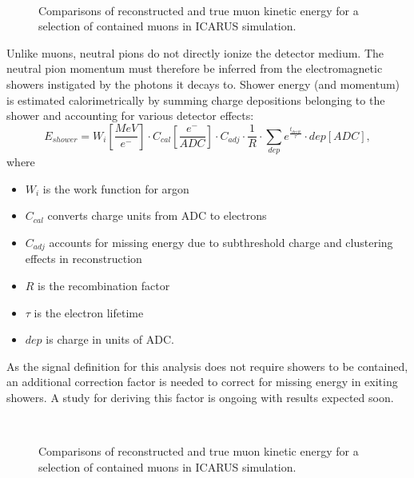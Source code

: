 \documentclass[../main.tex]{subfiles}
\begin{document}
\begin{figure}[H]
    \center
    \\


    \caption{Comparisons of reconstructed and true muon kinetic energy for a selection of contained muons in ICARUS simulation.}
    \label{fig:muon_energy}
\end{figure}

Unlike muons, neutral pions do not directly ionize the detector medium.  The neutral pion momentum must therefore be inferred from the electromagnetic showers instigated by the photons it decays to.  Shower energy (and momentum) is estimated calorimetrically by summing charge depositions belonging to the shower and accounting for various detector effects:
\begin{equation}
    E_{shower} = W_{i} [\frac{MeV}{e^{-}}] \cdot C_{cal} [\frac{e^{-}}{ADC}] \cdot C_{adj} \cdot \frac{1}{R} \cdot \sum_{dep} e^{\frac{t_{drift}}{\tau}} \cdot dep [ADC],
\end{equation}
where
\begin{itemize}[label=]
    \setlength\itemsep{0.1ex}
    \item $W_{i}$ is the work function for argon
    \item $C_{cal}$ converts charge units from ADC to electrons
    \item $C_{adj}$ accounts for missing energy due to subthreshold charge and clustering effects in reconstruction
    \item $R$ is the recombination factor
    \item $\tau$ is the electron lifetime
    \item $dep$ is charge in units of ADC.
\end{itemize}
As the signal definition for this analysis does not require showers to be contained, an additional correction factor is needed to correct for missing energy in exiting showers.  A study for deriving this factor is ongoing with results expected soon.

\begin{figure}[H]
    \center
    \\


    \caption{Comparisons of reconstructed and true muon kinetic energy for a selection of contained muons in ICARUS simulation.}
    \label{fig:prephase_efficiency}
\end{figure}
\end{document}
